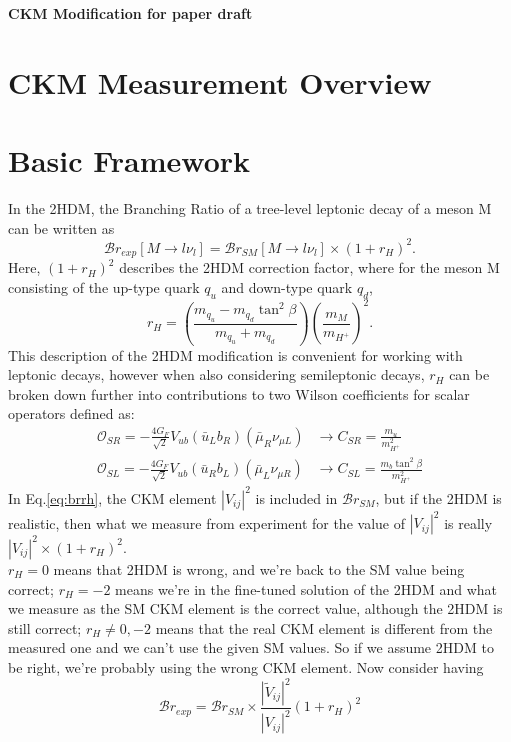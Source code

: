 \documentclass[11pt]{article}
\newcommand{\tVVt}{\frac{|\tilde{V}_{ij}|^2}{|V_{ij}|^2}}
\begin{document}
{\Large\bfseries CKM Modification for paper draft}
\section{CKM Measurement Overview}

\section{Basic Framework}
In the 2HDM, the Branching Ratio of a tree-level leptonic decay of a meson M can be written as
\begin{equation}
    \label{eq:brrh}
    \mathcal{B}r_{exp}[M\to l\nu_l] = \mathcal{B}r_{SM}[M\to l\nu_l]\times(1+r_H)^2.
\end{equation}
Here, $(1+r_H)^2$ describes the 2HDM correction factor, where for the meson M consisting of the up-type quark $q_u$ and down-type quark $q_d$,
\begin{equation}
    r_H = \left(\frac{m_{q_u}-m_{q_d}\tan^2\beta}{m_{q_u}+m_{q_d}}\right)\left(\frac{m_M}{m_{H^+}}\right)^2.
\end{equation}
This description of the 2HDM modification is convenient for working with leptonic decays, however when also considering semileptonic decays, $r_H$ can be broken down further into contributions to two Wilson coefficients for scalar operators defined as:
\begin{align}
    \mathcal{O}_{SR} = -\frac{4G_F}{\sqrt{2}}V_{ub}(\bar{u}_Lb_R)(\bar{\mu}_R\nu_{\mu L}) &\to C_{SR} = \frac{m_u}{m_{H^+}^2} \\
    \mathcal{O}_{SL} = -\frac{4G_F}{\sqrt{2}}V_{ub}(\bar{u}_Rb_L)(\bar{\mu}_L\nu_{\mu R}) &\to C_{SL} = \frac{m_b\tan^2\beta}{m_{H^+}^2} 
\end{align}
In Eq.\eqref{eq:brrh}, the CKM element $|V_{ij}|^2$ is included in $\mathcal{B}r_{SM}$, but if the 2HDM is realistic, then what we measure from experiment for the value of $|V_{ij}|^2$ is really $|V_{ij}|^2\times(1+r_H)^2$.\\
$r_H=0$ means that 2HDM is wrong, and we're back to the SM value being correct;
$r_H=-2$ means we're in the fine-tuned solution of the 2HDM and what we measure as the SM CKM element is the correct value, although the 2HDM is still correct;
$r_H\neq0,-2$ means that the real CKM element is different from the measured one and we can't use the given SM values.
So if we assume 2HDM to be right, we're probably using the wrong CKM element.
Now consider having
    \begin{equation*}
        \mathcal{B}r_{exp} = \mathcal{B}r_{SM}\times\tVVt(1+r_H)^2
    \end{equation*}
\end{document}
